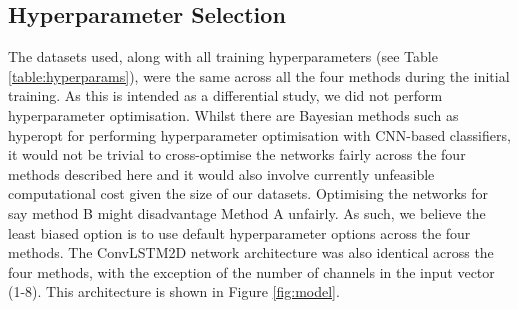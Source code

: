 \subsection{Hyperparameter Selection}
The datasets used, along with all training hyperparameters (see Table \ref{table:hyperparams}), were the same across all the four methods during the initial training. As this is intended as a differential study, we did not perform hyperparameter optimisation. Whilst there are Bayesian methods such as hyperopt \cite{hyperopt} for performing hyperparameter optimisation with CNN-based classifiers, it would not be trivial to cross-optimise the networks fairly across the four methods described here and it would also involve currently unfeasible computational cost given the size of our datasets. Optimising the networks for say method B might disadvantage Method A unfairly. As such, we believe the least biased option is to use default hyperparameter options across the four methods. The ConvLSTM2D network architecture was also identical across the four methods, with the exception of the number of channels in the input vector (1-8).  This architecture is shown in Figure \ref{fig:model}.

\begin{table}[ht]
    \centering
    \caption{Training hyperparameters used; these were the same throughout all the networks during the initial training for both the point source and diffuse cases. The diffuse ES runs also used these hyperparameters.}
    \label{table:hyperparams}
\end{table}

